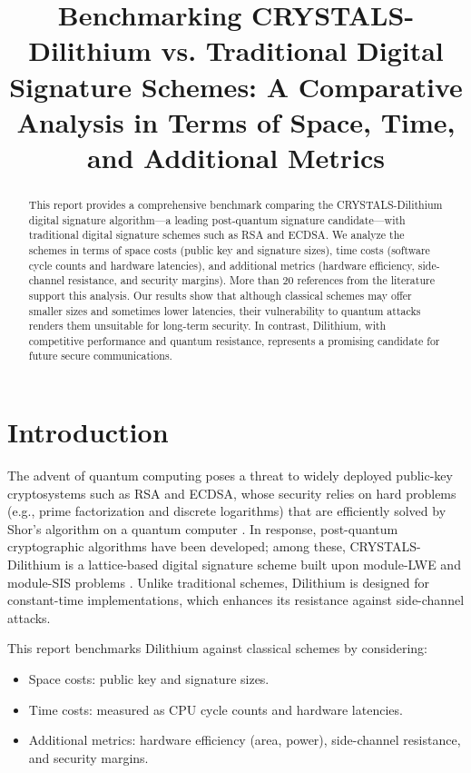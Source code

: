\documentclass{article}
\title{Benchmarking CRYSTALS-Dilithium vs. Traditional Digital Signature Schemes: A Comparative Analysis in Terms of Space, Time, and Additional Metrics}
\author{}
\date{}
\begin{document}
\maketitle

\begin{abstract}
This report provides a comprehensive benchmark comparing the CRYSTALS-Dilithium digital signature algorithm—a leading post-quantum signature candidate—with traditional digital signature schemes such as RSA and ECDSA. We analyze the schemes in terms of space costs (public key and signature sizes), time costs (software cycle counts and hardware latencies), and additional metrics (hardware efficiency, side-channel resistance, and security margins). More than 20 references from the literature support this analysis. Our results show that although classical schemes may offer smaller sizes and sometimes lower latencies, their vulnerability to quantum attacks renders them unsuitable for long-term security. In contrast, Dilithium, with competitive performance and quantum resistance, represents a promising candidate for future secure communications.
\end{abstract}

\section{Introduction}
The advent of quantum computing poses a threat to widely deployed public-key cryptosystems such as RSA and ECDSA, whose security relies on hard problems (e.g., prime factorization and discrete logarithms) that are efficiently solved by Shor’s algorithm on a quantum computer \cite{ref5}. In response, post-quantum cryptographic algorithms have been developed; among these, CRYSTALS-Dilithium is a lattice-based digital signature scheme built upon module-LWE and module-SIS problems \cite{ref0, ref4}. Unlike traditional schemes, Dilithium is designed for constant-time implementations, which enhances its resistance against side-channel attacks.

This report benchmarks Dilithium against classical schemes by considering:
\begin{itemize}
    \item Space costs: public key and signature sizes.
    \item Time costs: measured as CPU cycle counts and hardware latencies.
    \item Additional metrics: hardware efficiency (area, power), side-channel resistance, and security margins.
\end{itemize}
\end{document}
